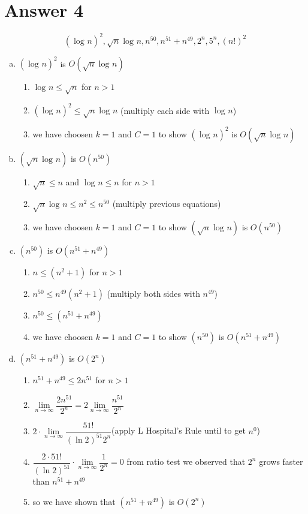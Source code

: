 \documentclass[12pt]{article}
\begin{document}
\section*{Answer 4}
$$(\log_{}n)^2 ,\sqrt{n}\log_{}n, n^{50}, n^{51} + n^{49}, 2^n, 5^n, (n!)^2$$
\begin{enumerate}[a)]
    \item $(\log_{}n)^2$ is $O(\sqrt{n}\log_{}n)$
    \begin{enumerate} [1)]
        \item $\log_{}n \leq \sqrt{n}$ for $n > 1$
        \item $(\log_{}n)^2 \leq \sqrt{n}\log_{}n $ (multiply each side with $\log_{}n$)
        \item we have choosen $k=1$ and $C=1$ to show $(\log_{}n)^2$ is $O(\sqrt{n}\log_{}n)$
    \end{enumerate}
    \item $(\sqrt{n}\log_{}n)$ is $O(n^{50})$
    \begin{enumerate}[1)]
        \item $\sqrt{n} \leq n$ and $\log_{}n \leq  n$ for $n > 1$
        \item $\sqrt{n}\log_{}n \leq n^2 \leq n^{50}$ (multiply previous equations)
        \item we have choosen $k=1$ and $C=1$ to show $(\sqrt{n}\log_{}n)$ is $O(n^{50})$
    \end{enumerate}
    \item $(n^{50})$ is $O(n^{51} + n^{49})$
    \begin{enumerate}[1)]
        \item $n \leq (n^2+1)$ for $n>1$
        \item $n^{50} \leq n^{49}(n^2+1)$ (multiply both sides with $n^{49}$)
        \item $n^{50} \leq (n^{51} + n^{49})$
        \item we have choosen $k=1$ and $C=1$ to show  $(n^{50})$ is $O(n^{51} + n^{49})$
    \end{enumerate}
    \item $(n^{51} + n^{49})$ is $O(2^n)$
    \begin{enumerate} [1)]
        \item $n^{51} + n^{49} \leq 2n^{51}$ for $n > 1$
        \item $\lim\limits_{n\to\infty} \dfrac{2n^{51}}{2^n} = 2\lim\limits_{n\to\infty} \dfrac{n^{51}}{2^n}$
        \item $2\cdot\lim\limits_{n\to\infty} \dfrac{51!}{(\ln{2})^{51}2^n}$(apply L Hospital's Rule until to get $n^0$)
        \item $\dfrac{2\cdot51!}{(\ln{2})^{51}} \cdot \lim\limits_{n\to\infty} \dfrac{1}{2^n} = 0 $ from ratio test we observed that $2^n$ grows faster than $n^{51} + n^{49}$
        \item so we have shown that $(n^{51} + n^{49})$ is $O(2^n)$
        

\end{enumerate}
\end{enumerate}
\end{document}
